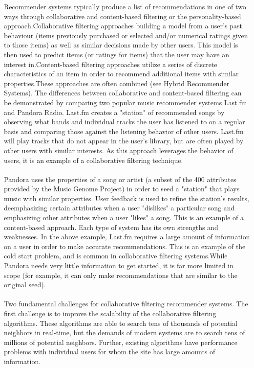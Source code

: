 \documentclass[paper=a4, fontsize=12pt]{scrartcl}
\numberwithin{equation}{section}		%
\numberwithin{figure}{section}			%
\numberwithin{table}{section}				%
\begin{document}
Recommender systems typically produce a list of recommendations in one of two ways through collaborative and content-based filtering or the personality-based approach.Collaborative filtering approaches building a model from a user's past behaviour (items previously purchased or selected and/or numerical ratings given to those items) as well as similar decisions made by other users. This model is then used to predict items (or ratings for items) that the user may have an interest in.Content-based filtering approaches utilize a series of discrete characteristics of an item in order to recommend additional items with similar properties.These approaches are often combined (see Hybrid Recommender Systems).
The differences between collaborative and content-based filtering can be demonstrated by comparing two popular music recommender systems Last.fm and Pandora Radio.
Last.fm creates a "station" of recommended songs by observing what bands and individual tracks the user has listened to on a regular basis and comparing those against the listening behavior of other users. Last.fm will play tracks that do not appear in the user's library, but are often played by other users with similar interests. As this approach leverages the behavior of users, it is an example of a collaborative filtering technique.
\\
\\
Pandora uses the properties of a song or artist (a subset of the 400 attributes provided by the Music Genome Project) in order to seed a "station" that plays music with similar properties. User feedback is used to refine the station's results, deemphasizing certain attributes when a user "dislikes" a particular song and emphasizing other attributes when a user "likes" a song. This is an example of a content-based approach.
Each type of system has its own strengths and weaknesses. In the above example, Last.fm requires a large amount of information on a user in order to make accurate recommendations. This is an example of the cold start problem, and is common in collaborative filtering systems.While Pandora needs very little information to get started, it is far more limited in scope (for example, it can only make recommendations that are similar to the original seed).
\\
\\
Two fundamental challenges for collaborative filtering recommender systems.
The first challenge is to improve the scalability of the collaborative filtering algorithms. These algorithms are able to search tens of thousands of potential neighbors in real-time, but the demands of modern systems are to search tens of millions of potential neighbors. Further, existing algorithms have performance problems with individual users for whom the site has large amounts of information.
\end{document}
